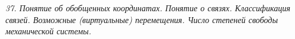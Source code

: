 \emph{37. Понятие об обобщенных координатах. Понятие о связях. Классификация
связей. Возможные (виртуальные) перемещения. Число степеней свободы
механической системы.}

\newpage
